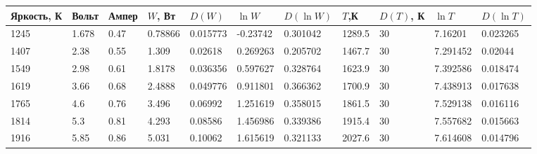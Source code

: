 \documentclass[%
 reprint,
 amsmath,amssymb,
 aps,
]{revtex4-2}
\begin{document}
\begin{table}[]
	\begin{tabular}{lll|l|l|l|l|l|lll}
		\hline
		\multicolumn{1}{|l|}{Яркость, К} & \multicolumn{1}{l|}{Вольт} & Ампер & $W$, Вт        & $D(W)$            & $\ln W$              & $D(\ln W)$    & $T$,К           & \multicolumn{1}{l|}{$D(T)$, К} & \multicolumn{1}{l|}{$\ln T$}  & \multicolumn{1}{l|}{$D(\ln T)$} \\ \hline
		\multicolumn{1}{|l|}{1245}       & \multicolumn{1}{l|}{1.678} & 0.47  & 0.78866        & 0.015773          & -0.23742             & 0.301042     & 1289.5          & \multicolumn{1}{l|}{30}        & \multicolumn{1}{l|}{7.16201}  & \multicolumn{1}{l|}{0.023265}   \\ \hline
		\multicolumn{1}{|l|}{1407}       & \multicolumn{1}{l|}{2.38}  & 0.55  & 1.309          & 0.02618           & 0.269263             & 0.205702     & 1467.7          & \multicolumn{1}{l|}{30}        & \multicolumn{1}{l|}{7.291452} & \multicolumn{1}{l|}{0.02044}    \\ \hline
		\multicolumn{1}{|l|}{1549}       & \multicolumn{1}{l|}{2.98}  & 0.61  & 1.8178         & 0.036356          & 0.597627             & 0.328764     & 1623.9          & \multicolumn{1}{l|}{30}        & \multicolumn{1}{l|}{7.392586} & \multicolumn{1}{l|}{0.018474}   \\ \hline
		\multicolumn{1}{|l|}{1619}       & \multicolumn{1}{l|}{3.66}  & 0.68  & 2.4888         & 0.049776          & 0.911801             & 0.366362     & 1700.9          & \multicolumn{1}{l|}{30}        & \multicolumn{1}{l|}{7.438913} & \multicolumn{1}{l|}{0.017638}   \\ \hline
		\multicolumn{1}{|l|}{1765}       & \multicolumn{1}{l|}{4.6}   & 0.76  & 3.496          & 0.06992           & 1.251619             & 0.358015     & 1861.5          & \multicolumn{1}{l|}{30}        & \multicolumn{1}{l|}{7.529138} & \multicolumn{1}{l|}{0.016116}   \\ \hline
		\multicolumn{1}{|l|}{1814}       & \multicolumn{1}{l|}{5.3}   & 0.81  & 4.293          & 0.08586           & 1.456986             & 0.339386     & 1915.4          & \multicolumn{1}{l|}{30}        & \multicolumn{1}{l|}{7.557682} & \multicolumn{1}{l|}{0.015663}   \\ \hline
		\multicolumn{1}{|l|}{1916}       & \multicolumn{1}{l|}{5.85}  & 0.86  & 5.031          & 0.10062           & 1.615619             & 0.321133     & 2027.6          & \multicolumn{1}{l|}{30}        & \multicolumn{1}{l|}{7.614608} & \multicolumn{1}{l|}{0.014796}   \\ \hline

\end{tabular}
\end{table}
\end{document}
